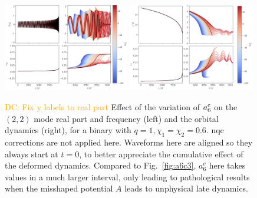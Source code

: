 \documentclass[prd,amssymb,amsmath,amsfonts,nofootinbib,reprint,showpacs,longbibliography]{revtex4-1}
\newcommand{\DC}[1]{{\textcolor{orange}{{DC: #1}} }}
\begin{document}
\begin{figure}
    \includegraphics[width=0.49\textwidth]{figs/delta_a6c_-100.0_30.0.png}
    \includegraphics[width=0.49\textwidth]{figs/delta_a6c_-100.0_30.0_dyn.png}
    \caption{\label{fig:a6c3_nqc} \DC{Fix y labels to real part}
    Effect of the variation of $a_6^{\rm c}$ on the $(2,2)$ mode real part and frequency (left) and the
    orbital dynamics (right), for a binary with $q = 1, \chi_1 = \chi_2 = 0.6$. \ac{nqc} corrections are not
    applied here.
    Waveforms here are aligned so they always start at $t = 0$, to better appreciate the cumulative effect of the
    deformed dynamics. Compared to Fig.~\ref{fig:a6c3}, $a_6^c$ here takes values in a much larger interval,
    only leading to pathological results when the misshaped potential $A$ leads to unphysical late dynamics.}
\end{figure}
\end{document}
